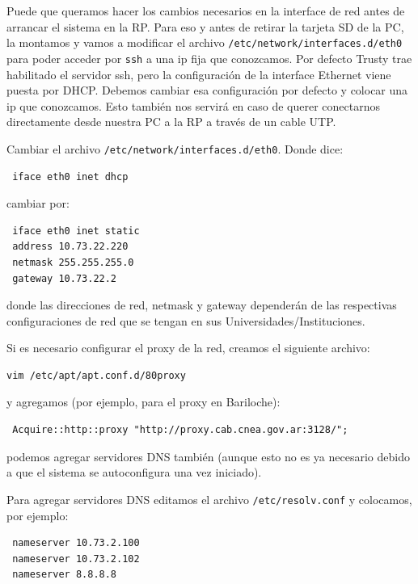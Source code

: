 \documentclass[a4paper,11pt]{article}
\begin{document}
\noindent Puede que queramos hacer los cambios necesarios en la interface de red antes de
arrancar el sistema en la RP. Para eso y antes de retirar la tarjeta SD de la
PC, la montamos y vamos a modificar el archivo
\texttt{/etc/network/interfaces.d/eth0} para poder acceder por \texttt{ssh} a una ip fija
que conozcamos. Por defecto Trusty trae habilitado el servidor ssh, pero la
configuración de la interface Ethernet viene puesta por DHCP. Debemos cambiar
esa configuración por defecto y colocar una ip que conozcamos. Esto también nos
servirá en caso de querer conectarnos directamente desde nuestra PC a la RP a
través de un cable UTP.

\noindent Cambiar el archivo \texttt{/etc/network/interfaces.d/eth0}. Donde
dice:

\begin{verbatim}
 iface eth0 inet dhcp
\end{verbatim}

\noindent cambiar por:

\begin{verbatim}
 iface eth0 inet static
 address 10.73.22.220 
 netmask 255.255.255.0
 gateway 10.73.22.2
\end{verbatim}

\noindent donde las direcciones de red, netmask y gateway dependerán de las 
respectivas configuraciones de red que se tengan en sus
Universidades/Instituciones.

\noindent Si es necesario configurar el proxy de la red, creamos el siguiente archivo:

\begin{verbatim}
vim /etc/apt/apt.conf.d/80proxy
\end{verbatim}

\noindent y agregamos (por ejemplo, para el proxy en Bariloche):

\begin{verbatim}
 Acquire::http::proxy "http://proxy.cab.cnea.gov.ar:3128/";
\end{verbatim}

\noindent podemos agregar servidores DNS también (aunque esto no es ya necesario
debido a que el sistema se autoconfigura una vez iniciado). 

Para agregar servidores DNS editamos el archivo \texttt{/etc/resolv.conf} y
colocamos, por ejemplo:

\begin{verbatim}
 nameserver 10.73.2.100
 nameserver 10.73.2.102
 nameserver 8.8.8.8
\end{verbatim}
\end{document}
